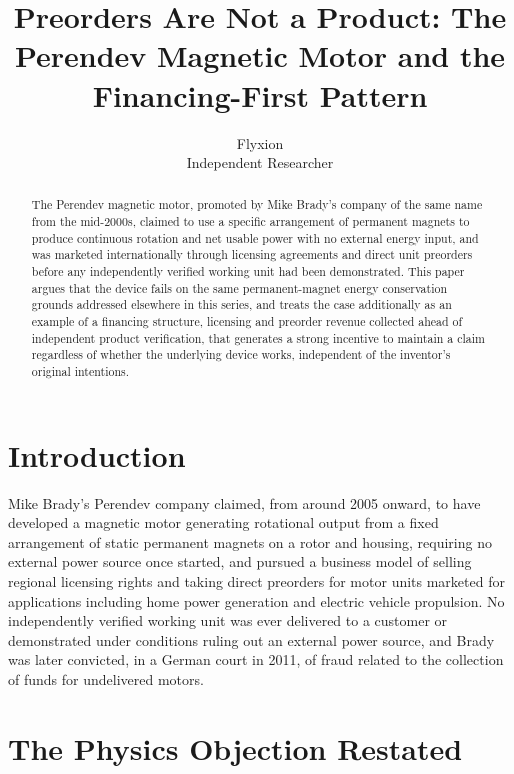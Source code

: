 \documentclass[11pt]{article}
\title{Preorders Are Not a Product: The Perendev Magnetic Motor and the Financing-First Pattern}
\author{Flyxion \\ \small Independent Researcher}
\date{}
\begin{document}
\maketitle

\begin{abstract}
The Perendev magnetic motor, promoted by Mike Brady's company of the same name from the mid-2000s, claimed to use a specific arrangement of permanent magnets to produce continuous rotation and net usable power with no external energy input, and was marketed internationally through licensing agreements and direct unit preorders before any independently verified working unit had been demonstrated. This paper argues that the device fails on the same permanent-magnet energy conservation grounds addressed elsewhere in this series, and treats the case additionally as an example of a financing structure, licensing and preorder revenue collected ahead of independent product verification, that generates a strong incentive to maintain a claim regardless of whether the underlying device works, independent of the inventor's original intentions.
\end{abstract}

\section{Introduction}

Mike Brady's Perendev company claimed, from around 2005 onward, to have developed a magnetic motor generating rotational output from a fixed arrangement of static permanent magnets on a rotor and housing, requiring no external power source once started, and pursued a business model of selling regional licensing rights and taking direct preorders for motor units marketed for applications including home power generation and electric vehicle propulsion. No independently verified working unit was ever delivered to a customer or demonstrated under conditions ruling out an external power source, and Brady was later convicted, in a German court in 2011, of fraud related to the collection of funds for undelivered motors.

\section{The Physics Objection Restated}
\end{document}
